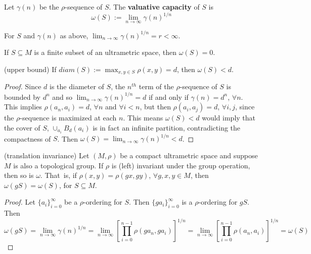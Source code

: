 \begin{definition*}
\cite{kj}  Let $\gamma(n)$ be the $\rho$-sequence of $S$. The \textbf{valuative capacity} of $S$ is \[\omega(S)
 := \lim_{n\to\infty} \gamma(n)^{1/n}\]  
\end{definition*}


\begin{proposition*}
\cite{kj} For $S$ and $\gamma(n)$ as above,  $\lim_{n\to\infty} \gamma(n)^{1/n} = r < \infty$. 
\end{proposition*}


\begin{proposition*}
 If $S \subseteq M$ is a finite subset of an ultrametric space, then $\omega(S) =0$.
\end{proposition*}


\begin{proposition*}
(upper bound) If $diam(S)  := \max_{x,y \in S} \rho(x,y)= d$, then $\omega(S) < d$.
\end{proposition*}

\begin{proof}
Since $d$ is the diameter of $S$, the $n^{th}$ term of the $\rho$-sequence of $S$ is bounded by $d^n$ and so $ \lim_{n\to\infty} \gamma(n)^{1/n}=d$ if and only if $\gamma(n)=d^n$, $\forall n$. This implies $\rho(a_n, a_i) = d$, $\forall n$ and $\forall i < n$, but then $\rho(a_i,a_j)=d$, $\forall i,j$, since the $\rho$-sequence is maximized at each $n$. This means $\omega(S) < d$ would imply that the cover of $S$, $\cup_{a_i} B_d(a_i)$ is in fact an infinite partition, contradicting the compactness of $S$. Then  $\omega(S)= \lim_{n\to\infty} \gamma(n)^{1/n}<d$. 
\end{proof}



\begin{proposition*}
	(translation invariance) Let $(M, \rho)$ be a compact ultrametric space and suppose $M$ is also a topological group. If $\rho$ is (left) invariant under the group operation, then so is $\omega$. That\ is, if $\rho(x,y)=\rho(gx,gy)$, $ \forall g,x,y \in M$, then $\omega(gS)=\omega(S)$, for $S \subseteq M$.	
\end{proposition*}

\begin{proof}
Let $\{a_i\}_{i=0}^\infty$ be a $\rho$-ordering for $S$. Then $\{ga_i\}_{i=0}^\infty$ is a $\rho$-ordering for $gS$. Then $$\omega(gS) = \lim_{n\to\infty} \gamma(n)^{1/n} =  \lim_{n\to\infty} [\prod_{i=0}^{n-1} \rho(ga_n,ga_i)]^{1/n} = \lim_{n\to\infty} [\prod_{i=0}^{n-1} \rho(a_n,a_i)]^{1/n}	 = \omega(S)$$
\end{proof}	


